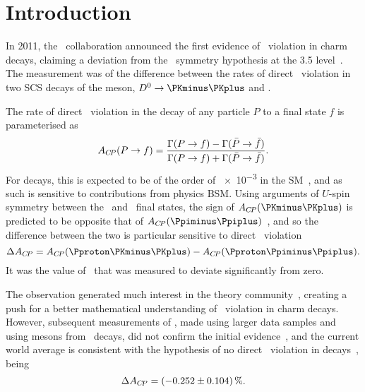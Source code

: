 \chapter{Introduction}
\label{chap:cpv:introduction}

In 2011, the \lhcb\ collaboration announced the first evidence of \CP\ 
violation in charm decays, claiming a deviation from the \CP\ symmetry 
hypothesis at the
\SI{3.5}{\sigma} level~\cite{Aaij:2011in}.
The measurement was of the difference between the rates of direct \CP\ 
violation in two \ac{SCS} decays of the \PDzero meson, $\decay{\PDzero}{\KmKp}$ 
and \pimpip.

The rate of direct \CP\ violation in the decay of any particle $P$ to a final 
state $f$ is parameterised as
\begin{equation}
  \ACP(\decay{P}{f}) = \frac{%
    \Gamma(\decay{P}{f}) - \Gamma(\decay{\bar{P}}{\bar{f}})
  }{%
    \Gamma(\decay{P}{f}) + \Gamma(\decay{\bar{P}}{\bar{f}})
  }.
  \label{eqn:cpv:introduction:acp}
\end{equation}
For \decay{\PDzero}{\hmhp} decays, this is expected to be of the order of 
\num{e-3} in the \ac{SM}~\cite{Grossman:2006jg}, and as such is sensitive to 
contributions from physics \acl{BSM}.
Using arguments of $U$-spin symmetry between the \KmKp\ and \pimpip\ final 
states, the sign of $\ACP(\KmKp)$ is predicted to be opposite that of 
$\ACP(\pimpip)$~\cite{Grossman:2006jg}, and so the difference between the two 
is particular sensitive to direct \CP\ violation
\begin{equation}
  \dACP = \ACP(\pKK) - \ACP(\ppipi).
  \label{eqn:cpv:introduction:dacp_pure}
\end{equation}
It was the value of \dACP\ that was measured to deviate significantly from 
zero.

The observation generated much interest in the theory 
community~\cite{Lenz:2013pwa}, creating a push for a better mathematical 
understanding of \CP\ violation in charm decays.
However, subsequent measurements of \dACP, made using larger data samples and 
using \PDzero mesons from \PB\ decays, did not confirm the initial 
evidence~\cite{Aaij:2014gsa,Aaij:2016cfh}, and the current world average is 
consistent with the hypothesis of no direct \CP\ violation in \PDzero 
decays~\cite{Amhis:2014hma}, being\footnotemark
\begin{equation}
  \dACP = \SI{-0.252 \pm 0.104}{\percent}.
  \label{eqn:cpv:introduction:dacp_world_average}
\end{equation}

